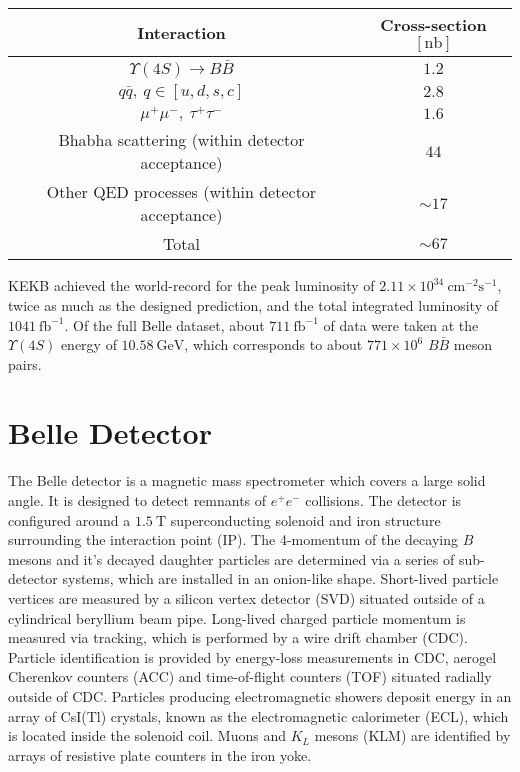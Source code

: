 \documentclass[headings=standardclasses,headings=big,oneside,a4paper,openany,12pt]{scrbook}
\newcommand {\e}[1]{\mathrm{~#1}}
\newcommand {\E}[1]{\times 10^{#1}}
\begin{document}


\begin{center}
	\begin{tabular}{c|c}
		Interaction & Cross-section $[\mathrm{nb}]$ \\ 
		\hline
		$\Upsilon(4S) \to B \bar B$ & $1.2$ \\
		$q \bar q,~q \in [u,d,s,c]$ & $2.8$ \\
		$\mu^+\mu^-,~\tau^+\tau^-$ & $1.6$ \\
		Bhabha scattering (within detector acceptance)& $44$ \\
		Other QED processes (within detector acceptance)& $\sim 17$ \\
		\hline
		Total & $\sim 67$ 
	\end{tabular} 
\end{center}

KEKB achieved the world-record for the peak luminosity of $2.11\E{34}\e{cm^{-2}s^{-1}}$, twice as much as the designed prediction, and the total integrated luminosity of $1041\e{fb^{-1}}$. Of the full Belle dataset, about $711\e{fb^{-1}}$ of data were taken at the $\Upsilon(4S)$ energy of $10.58\e{GeV}$, which corresponds to about $771\E{6}$ $B \bar B$ meson pairs.


\section{Belle Detector}
The Belle detector is a magnetic mass spectrometer which covers a large solid angle. It is designed to detect remnants of $e^+e^-$ collisions. The detector is configured around a $1.5\e{T}$ superconducting solenoid and iron structure surrounding the interaction point (IP). The 4-momentum of the decaying $B$ mesons and it's decayed daughter particles are determined via a series of sub-detector systems, which are installed in an onion-like shape. Short-lived particle vertices are measured by a silicon vertex detector (SVD) situated outside of a cylindrical beryllium beam pipe. Long-lived charged particle momentum is measured via tracking, which is performed by a wire drift chamber (CDC). Particle identification is provided by energy-loss measurements in CDC, aerogel Cherenkov counters (ACC) and time-of-flight counters (TOF) situated radially outside of CDC. Particles producing electromagnetic showers deposit energy in an array of CsI(Tl) crystals, known as the electromagnetic calorimeter (ECL), which is located inside the solenoid coil. Muons and $K_L$ mesons (KLM) are identified by arrays of resistive plate counters in the iron yoke. 
\end{document}
